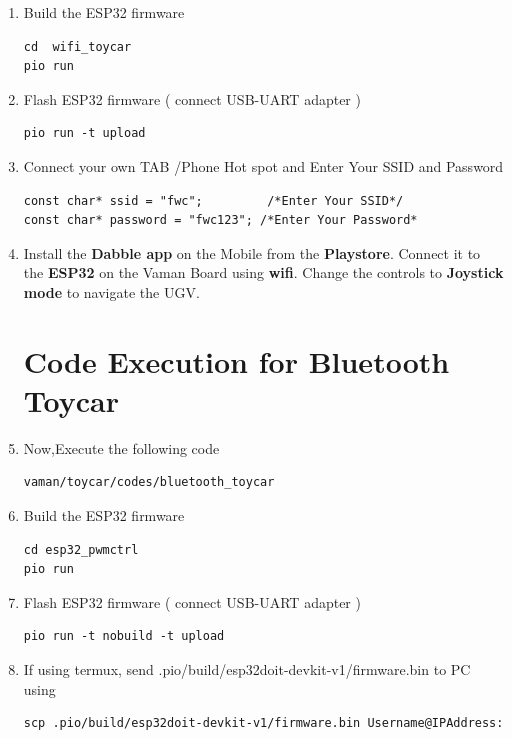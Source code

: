 \begin{enumerate}[label=\thesection.\arabic*.,ref=\thesection.\theenumi]
\item Build the ESP32 firmware
\begin{lstlisting}
cd  wifi_toycar
pio run
\end{lstlisting} 

\item Flash ESP32 firmware ( connect USB-UART adapter )
\begin{lstlisting}
pio run -t upload
\end{lstlisting} 

\item Connect your own TAB /Phone Hot spot and  Enter Your SSID and  Password
\begin{lstlisting}
const char* ssid = "fwc";         /*Enter Your SSID*/ 
const char* password = "fwc123"; /*Enter Your Password*
\end{lstlisting} 
\item Install the \textbf{Dabble app} on the Mobile from the \textbf{Playstore}. Connect it to the \textbf{ESP32} on the Vaman Board using \textbf{wifi}. Change the controls to \textbf{Joystick mode} to navigate the UGV.\\

\section{Code Execution for Bluetooth Toycar}
\raggedright
\item Now,Execute the following code 

\begin{lstlisting}
vaman/toycar/codes/bluetooth_toycar
\end{lstlisting}

\item Build the ESP32 firmware
\begin{lstlisting}
cd esp32_pwmctrl
pio run
\end{lstlisting} 

\item Flash ESP32 firmware ( connect USB-UART adapter )
\begin{lstlisting}
pio run -t nobuild -t upload
\end{lstlisting} 

\item If using termux, send .pio/build/esp32doit-devkit-v1/firmware.bin to PC using
\begin{lstlisting}
scp .pio/build/esp32doit-devkit-v1/firmware.bin Username@IPAddress:
\end{lstlisting} 


\end{enumerate}
